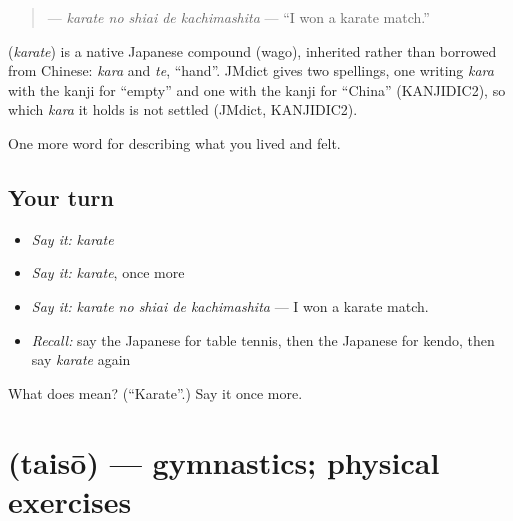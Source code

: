 \begin{quote}
\textbf{  } — \emph{karate no shiai de kachimashita} — \textquotedblleft{}I won a karate match.\textquotedblright{}
\end{quote}

\begin{cousinweb}
\textbf{} (\emph{karate}) is a native Japanese compound (wago), inherited rather than borrowed from Chinese: \emph{kara} and \emph{te}, \textquotedblleft{}hand\textquotedblright{}. JMdict gives two spellings, one writing \emph{kara} with the kanji for \textquotedblleft{}empty\textquotedblright{} and one with the kanji for \textquotedblleft{}China\textquotedblright{} (KANJIDIC2), so which \emph{kara} it holds is not settled (JMdict, KANJIDIC2).
\end{cousinweb}

\begin{grammarlens}[title={What you've built}]
One more word for describing what you lived and felt.
\end{grammarlens}

\subsection*{Your turn}
\begin{itemize}
\raggedright
  \item \emph{Say it:} \emph{karate}
  \item \emph{Say it:} \emph{karate}, once more
  \item \emph{Say it:} \emph{karate no shiai de kachimashita} — I won a karate match.
  \item \emph{Recall:} say the Japanese for table tennis, then the Japanese for kendo, then say \emph{karate} again
\end{itemize}

\begin{tcolorbox}[breakable,colback=teal!4,colframe=teal!35!black,title={Before you move on}]
What does  mean? (\textquotedblleft{}Karate\textquotedblright{}.) Say it once more.
\end{tcolorbox}
\section[\texorpdfstring{\ja{たいそう} (taisō)}{たいそう (taisō)}]{ (taisō) — gymnastics; physical exercises}

\label{lesson:JA-C461-taisou}



